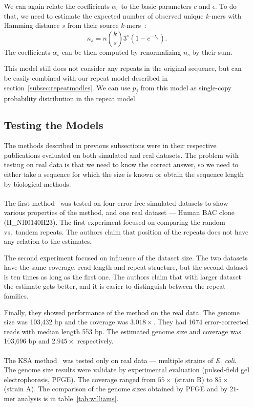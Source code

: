 We can again relate the coefficients $\alpha_s$ to the basic parameters $c$ and $\epsilon$. To do that, we need to estimate the expected number of observed unique $k$-mers with Hamming distance $s$ from their source $k$-mers~\cite{covest}:
$$n_s = n {k \choose s} 3^s (1- e^{-\lambda_s}).$$
The coefficients $\alpha_s$ can be then computed by renormalizing $n_s$ by their sum.

This model still does not consider any repeats in the original sequence, but can be easily combined with our repeat model described in section~\ref{subsec:repeatmodles}. We can use $p_j$ from this model as single-copy probability distribution in the repeat model.

\subsection{Testing the Models}
The methods described in previous subsections were in their respective publications evaluated on both simulated and real datasets. The problem with testing on real data is that we need to know the correct answer, so we need to either take a sequence for which the size is known or obtain the sequence length by biological methods.

\paragraph{}The first method~\cite{waterman} was tested on four error-free simulated datasets to show various properties of the method, and one real dataset --- Human BAC clone (H\_NH0140H23). The first experiment focused on comparing the random vs.\ tandem repeats. The authors claim that position of the repeats does not have any relation to the estimates.

The second experiment focused on influence of the dataset size. The two datasets have the same coverage, read length and repeat structure, but the second dataset is ten times as long as the first one. The authors claim that with larger dataset the estimate gets better, and it is easier to distinguish between the repeat families.

Finally, they showed performance of the method on the real data.
The genome size was 103,432 bp and the coverage was $3.018\times$.
They had 1674 error-corrected reads with median length 553 bp.
The estimated genome size and coverage was 103,696 bp and $2.945\times$ respectively.

\paragraph{}The KSA method~\cite{williams} was tested only on real data --- multiple strains of \emph{E. coli}. The genome size results were validate by experimental evaluation (pulsed-field gel electrophoresis, PFGE). The coverage ranged from $55\times$ (strain B) to $85\times$ (strain A). The comparison of the genome sizes obtained by PFGE and by $21$-mer analysis is in table~\ref{tab:williams}.


